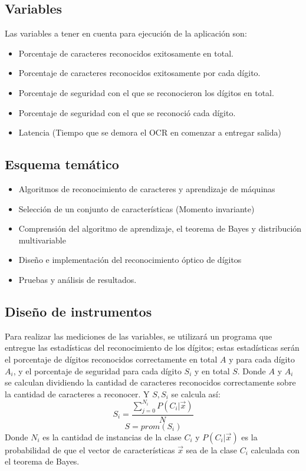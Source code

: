 \documentclass[a4paper, 11pt, oneside]{article}
\begin{document}
	\subsection{Variables}
	Las variables a tener en cuenta para ejecución de la aplicación son:
	\begin{itemize}
	\item Porcentaje de caracteres reconocidos exitosamente en total.
	\item Porcentaje de caracteres reconocidos exitosamente por cada dígito.
	\item Porcentaje de seguridad con el que se reconocieron los dígitos en total.
	\item Porcentaje de seguridad con el que se reconoció cada dígito.
	\item Latencia (Tiempo que se demora el OCR en comenzar a entregar salida)
	\end{itemize}
		
	\subsection{Esquema temático}
	\begin{itemize}
		\item Algoritmos de reconocimiento de caracteres y aprendizaje de máquinas
		\item Selección de un conjunto de características (Momento invariante)
		\item Comprensión del algoritmo de aprendizaje, el teorema de Bayes y distribución multivariable
		\item Diseño e implementación del reconocimiento óptico de dígitos
		\item Pruebas y análisis de resultados.
	\end{itemize}
	
	\subsection{Diseño de instrumentos}
	Para realizar las mediciones de las variables, se utilizará un programa que entregue las estadísticas
	del reconocimiento de los dígitos; estas estadísticas serán el porcentaje de dígitos reconocidos
	correctamente en total $A$ y para cada dígito $A_i$, y el porcentaje de seguridad para cada dígito $S_i$
	y en total $S$. Donde $A$ y $A_i$ se calculan dividiendo la cantidad de caracteres reconocidos correctamente
	sobre la cantidad de caracteres a reconocer. Y $S,S_i$ se calcula así: 
	\[ S_i = \frac{ \sum_{j=0}^{N_i}P(C_i|\vec{x}) }{N} \]
	\[ S = prom(S_i) \]
	Donde $N_i$ es la cantidad de instancias de la clase $C_i$ y $P(C_i|\vec{x})$ es la probabilidad de que el
	vector de características $\vec{x}$ sea de la clase $C_i$ calculada con el teorema de Bayes.
	
\end{document}
